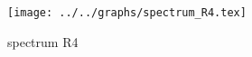 \begin{figure}[h] \centering\texttt{[image: ../../graphs/spectrum\_R4.tex]}\caption{spectrum R4}\label{gr:spectrum_R4} \end{figure}
